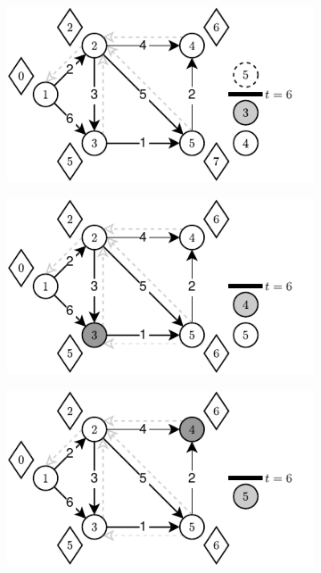 \begin{figure}[!h]
\begin{subfigure}[b]{0.32\textwidth}
		\caption{}
	\end{subfigure}
	\begin{subfigure}[b]{0.32\textwidth}
		\includegraphics[width=\textwidth]{Chapter_III/THRESHOLD-Example/d.pdf}
		\caption{}
	\end{subfigure}
	\begin{subfigure}[b]{0.32\textwidth}
		\includegraphics[width=\textwidth]{Chapter_III/THRESHOLD-Example/e.pdf}
		\caption{}
	\end{subfigure}
	\begin{subfigure}[b]{0.32\textwidth}
		\includegraphics[width=\textwidth]{Chapter_III/THRESHOLD-Example/f.pdf}

\end{subfigure}
\end{figure}
